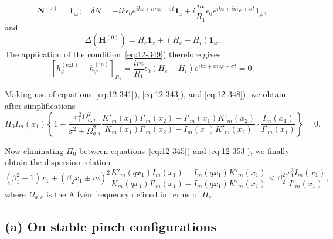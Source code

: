\begin{equation}
\label{eq:12-350}
\mathbf{N}^{(0)} = \mathbf{1}_\varpi; \quad \delta N = -ik\epsilon_0 e^{ikz+im\varphi+\sigma t}\mathbf{1}_z + i\frac{m}{R_1}\epsilon_0 e^{ikz+im\varphi+\sigma t}\mathbf{1}_\varphi,
\end{equation}
and
\begin{equation}
\label{eq:12-351}
\Delta(\mathbf{H}^{(0)}) = H_e \mathbf{1}_z + (H_e - H_i)\mathbf{1}_\varphi.
\end{equation}
The application of the condition~\eqref{eq:12-349}) therefore gives
\begin{equation}
\label{eq:12-352}
[h_\varphi^{(\mathrm{ext})} - h_\varphi^{(\mathrm{in})}]_{R_1} = \frac{im}{R_1}\epsilon_0(H_e - H_i)e^{ikz+im\varphi+\sigma t} = 0.
\end{equation}

Making use of equations~\eqref{eq:12-341}), \eqref{eq:12-343}), and \eqref{eq:12-348}), we obtain after simplifications
\begin{equation}
\label{eq:12-353}
\Pi_0 I_m(x_1) \left\{1 + \frac{x_1^2\Omega_{a,i}^2}{\sigma^2+\Omega_{a,i}^2}\frac{K'_m(x_1)I'_m(x_2)-I'_m(x_1)K'_m(x_2)}{K_m(x_1)I'_m(x_2)-I_m(x_1)K'_m(x_2)} \cdot \frac{I_m(x_1)}{I'_m(x_1)}\right\} = 0.
\end{equation}

Now eliminating $\Pi_0$ between equations~\eqref{eq:12-345}) and \eqref{eq:12-353}), we finally obtain the dispersion relation
\begin{equation}
\label{eq:12-354}
(\beta_1^2+1) x_1 + (\beta_2 x_1 \pm m)^2 \frac{K'_m(qx_1)I_m(x_1)-I_m(qx_1)K'_m(x_1)}{K_m(qx_1)I'_m(x_1)-I_m(qx_1)K'_m(x_1)} < \beta_2^2\frac{x_1^2 I_m(x_1)}{I'_m(x_1)},
\end{equation}
where $\Omega_{a,e}$ is the Alfv\'en frequency defined in terms of $H_e$.

\subsection*{(a) On stable pinch configurations}

